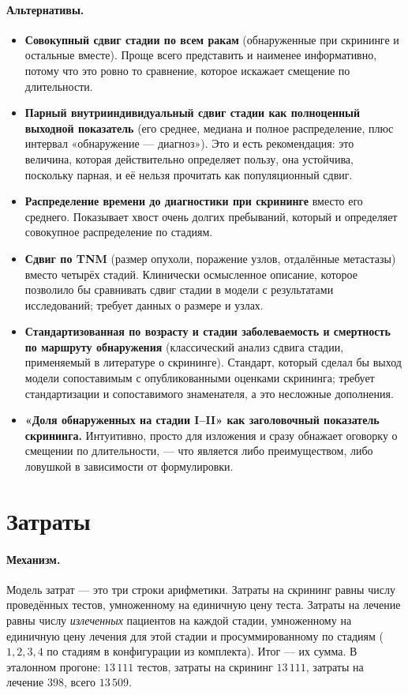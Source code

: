 \documentclass[12pt,a4paper]{article}
\newcommand{\mech}[1]{\paragraph{Механизм.} #1}
\newcommand{\alt}[1]{\paragraph{Альтернативы.} #1}
\begin{document}
\alt{\begin{itemize}[nosep]
  \item \textbf{Совокупный сдвиг стадии по всем ракам} (обнаруженные при скрининге и остальные вместе). Проще
        всего представить и наименее информативно, потому что это ровно то сравнение, которое искажает
        смещение по длительности.
  \item \textbf{Парный внутрииндивидуальный сдвиг стадии как полноценный выходной показатель} (его среднее,
        медиана и полное распределение, плюс интервал «обнаружение --- диагноз»). Это и есть рекомендация: это
        величина, которая действительно определяет пользу, она устойчива, поскольку парная, и её нельзя
        прочитать как популяционный сдвиг.
  \item \textbf{Распределение времени до диагностики при скрининге} вместо его среднего. Показывает хвост
        очень долгих пребываний, который и определяет совокупное распределение по стадиям.
  \item \textbf{Сдвиг по TNM} (размер опухоли, поражение узлов, отдалённые метастазы) вместо четырёх стадий.
        Клинически осмысленное описание, которое позволило бы сравнивать сдвиг стадии в модели с результатами
        исследований; требует данных о размере и узлах.
  \item \textbf{Стандартизованная по возрасту и стадии заболеваемость и смертность по маршруту обнаружения}
        (классический анализ сдвига стадии, применяемый в литературе о скрининге). Стандарт, который сделал
        бы выход модели сопоставимым с опубликованными оценками скрининга; требует стандартизации и
        сопоставимого знаменателя, а это несложные дополнения.
  \item \textbf{«Доля обнаруженных на стадии I--II» как заголовочный показатель скрининга.} Интуитивно,
        просто для изложения и сразу обнажает оговорку о смещении по длительности, --- что является либо
        преимуществом, либо ловушкой в зависимости от формулировки.
\end{itemize}}

\section{Затраты}

\mech{Модель затрат --- это три строки арифметики. Затраты на скрининг равны числу проведённых тестов,
умноженному на единичную цену теста. Затраты на лечение равны числу \emph{излеченных} пациентов на каждой
стадии, умноженному на единичную цену лечения для этой стадии и просуммированному по стадиям ($1,2,3,4$ по
стадиям в конфигурации из комплекта). Итог --- их сумма. В эталонном прогоне: $13\,111$ тестов, затраты на
скрининг $13\,111$, затраты на лечение $398$, всего $13\,509$.}
\end{document}
